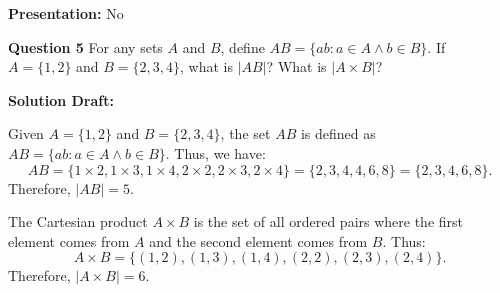 \documentclass{article}
\begin{document}
\noindent\textbf{Presentation:} No

\vspace{0.5cm} %

\noindent\textbf{Question 5}
For any sets \( A \) and \( B \), define \( AB = \{ab : a \in A \land b \in B\} \). If \( A = \{1,2\} \) and \( B = \{2,3,4\} \), what is \( |AB| \)? What is \( |A \times B| \)?

\vspace{0.5cm} %

\noindent\textbf{Solution Draft:}

Given \( A = \{1,2\} \) and \( B = \{2,3,4\} \), the set \( AB \) is defined as \( AB = \{ab : a \in A \land b \in B\} \). Thus, we have:
\[
AB = \{1 \times 2, 1 \times 3, 1 \times 4, 2 \times 2, 2 \times 3, 2 \times 4\} = \{2, 3, 4, 4, 6, 8\} = \{2, 3, 4, 6, 8\}.
\]
Therefore, \( |AB| = 5 \).

The Cartesian product \( A \times B \) is the set of all ordered pairs where the first element comes from \( A \) and the second element comes from \( B \). Thus:
\[
A \times B = \{(1,2), (1,3), (1,4), (2,2), (2,3), (2,4)\}.
\]
Therefore, \( |A \times B| = 6 \).
\end{document}
